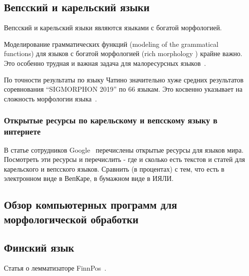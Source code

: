\subsection{Вепсский и карельский языки}\label{sect_review_veps_karelian}

Вепсский и карельский языки являются языками с богатой морфологией. 

Моделирование грамматических функций (modeling of the grammatical functions) 
для языков с богатой морфологией (rich morphology
) крайне важно. 
Это особенно трудная и важная задача 
для малоресурсных языков~\cite[2820]{Cruz-Anastasopoulos-Stump2020Chatino}.


\bigskip
По точности результаты по языку Чатино значительно хуже 
средних результатов соревнования ``SIGMORPHON 2019'' по 66 языкам. 
Это косвенно указывает на сложность морфологии языка~\cite[2822]{Cruz-Anastasopoulos-Stump2020Chatino}.


\subsubsection{Открытые ресурсы по карельскому и вепсскому языку в интернете} \label{sect_open_krl_vep_inet}

В статье сотрудников Google~\cite{Prasad2018} перечислены открытые ресурсы для языков мира. 
Посмотреть эти ресурсы и перечислить - где и сколько есть текстов и статей 
для карельского и вепсского языков. Сравнить (в процентах) с тем, что есть 
в электронном виде в ВепКаре, в бумажном виде в ИЯЛИ.








\subsection{Обзор компьютерных программ для морфологической обработки}

\subsection{Финский язык}\label{sect_review_fin}

Статья о лемматизаторе FinnPos~\cite{silfverberg2016finnpos}.

